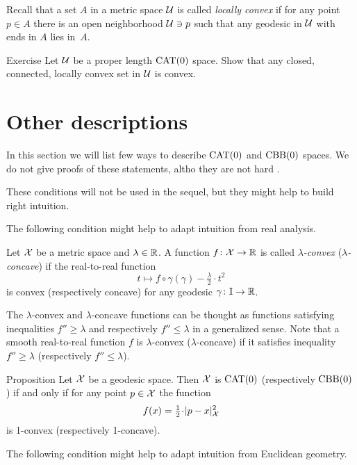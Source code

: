 Recall that a set $A$ in a metric space $\mathcal{U}$ is called \emph{locally convex} if for any point $p\in A$ there is an open neighborhood $\mathcal{U}\ni p$ such that any geodesic in $\mathcal{U}$ with  ends in $A$ lies in~$A$. 

\begin{thm}{Exercise}\label{ex:locally-convex}
Let $\mathcal{U}$ be a proper length $\mathrm{CAT}(0)$ space.
Show that any closed, connected, locally convex set in $\mathcal{U}$ is convex.
\end{thm}



\section{Other descriptions}

In this section we will list few ways to describe $\mathrm{CAT}(0)$ and $\mathrm{CBB}(0)$ spaces.
We do not give proofs of these statements, altho they are not hard \cite[see][ and the references therein]{alexander-kapovitch-petrunin-2025}.

These conditions will not be used in the sequel, but they might help to build right intuition.  

The following condition might help to adapt intuition from real analysis.

Let $\mathcal{X}$ be a metric space and $\lambda\in\mathbb{R}$.
A function $f\colon\mathcal{X}\to \mathbb{R}$ is called \emph{$\lambda$-convex} (\emph{$\lambda$-concave}) if 
the real-to-real function 
\[t\mapsto f\circ\gamma(\gamma)-\tfrac{\lambda}{2}\cdot t^2\] 
is convex (respectively concave)
for any geodesic $\gamma\colon\mathbb{I}\to \mathbb{R}$.

The $\lambda$-convex  and $\lambda$-concave functions can be thought as functions satisfying inequalities $f''\ge\lambda$ and respectively $f''\le\lambda$ in a generalized sense.
Note that a smooth real-to-real function $f$ is $\lambda$-convex ($\lambda$-concave) if it satisfies inequality $f''\ge\lambda$ (respectively $f''\le\lambda$).

\begin{thm}{Proposition}
Let $\mathcal{X}$ be a geodesic space.
Then $\mathcal{X}$ is $\mathrm{CAT}(0)$ (respectively $\mathrm{CBB}(0)$) if and only if for any point $p\in \mathcal{X}$ the function
\[f(x)=\tfrac12\cdot\dist[2]{p}{x}{\spc{X}}\]
is 1-convex (respectively 1-concave).
\end{thm}

The following condition might help to adapt intuition from Euclidean geometry.

